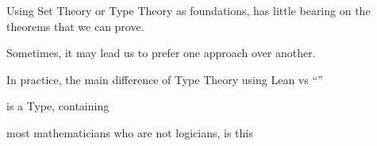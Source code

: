 \documentclass{beamer}
\begin{document}
\begin{frame}[fragile]

Using Set Theory or Type Theory as foundations, has little bearing on the theorems that we can prove.

Sometimes, it may lead us to prefer one approach over another.

In practice, the main difference of Type Theory using Lean vs ``''
\end{frame}

\begin{frame}[fragile]

 is a Type, containing

 most mathematicians who are not logicians, is this
\end{frame}
\end{document}
